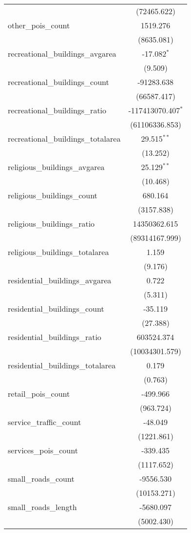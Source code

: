 \begin{table}[!htbp]
\begin{tabular}{@{\extracolsep{5pt}}lc}
  & (72465.622) \\
 other_pois_count & 1519.276$^{}$ \\
  & (8635.081) \\
 recreational_buildings_avgarea & -17.082$^{*}$ \\
  & (9.509) \\
 recreational_buildings_count & -91283.638$^{}$ \\
  & (66587.417) \\
 recreational_buildings_ratio & -117413070.407$^{*}$ \\
  & (61106336.853) \\
 recreational_buildings_totalarea & 29.515$^{**}$ \\
  & (13.252) \\
 religious_buildings_avgarea & 25.129$^{**}$ \\
  & (10.468) \\
 religious_buildings_count & 680.164$^{}$ \\
  & (3157.838) \\
 religious_buildings_ratio & 14350362.615$^{}$ \\
  & (89314167.999) \\
 religious_buildings_totalarea & 1.159$^{}$ \\
  & (9.176) \\
 residential_buildings_avgarea & 0.722$^{}$ \\
  & (5.311) \\
 residential_buildings_count & -35.119$^{}$ \\
  & (27.388) \\
 residential_buildings_ratio & 603524.374$^{}$ \\
  & (10034301.579) \\
 residential_buildings_totalarea & 0.179$^{}$ \\
  & (0.763) \\
 retail_pois_count & -499.966$^{}$ \\
  & (963.724) \\
 service_traffic_count & -48.049$^{}$ \\
  & (1221.861) \\
 services_pois_count & -339.435$^{}$ \\
  & (1117.652) \\
 small_roads_count & -9556.530$^{}$ \\
  & (10153.271) \\
 small_roads_length & -5680.097$^{}$ \\
  & (5002.430) \\

\end{tabular}
\end{table}
